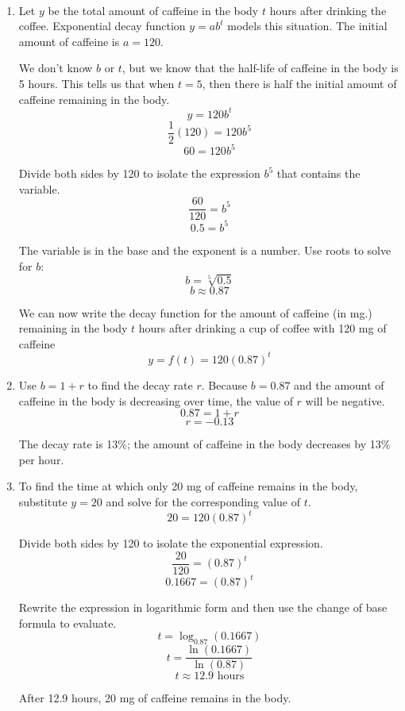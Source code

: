 \begin{solution} ~
    \begin{enumerate}
        \item Let $y$ be the total amount of caffeine in the body $t$ hours after drinking the coffee. Exponential decay function $y = ab^t$ models this situation. The initial amount of caffeine is $a = 120$.

              We don't know $b$ or $t$, but we know that the half-life of caffeine in the body is 5 hours. This tells us that when $t = 5$, then there is half the initial amount of caffeine remaining in the body.
              \[ y = 120b^t \]
              \[ \frac{1}{2}(120) = 120b^5 \]
              \[ 60 = 120b^5 \]

              Divide both sides by 120 to isolate the expression $b^5$ that contains the variable.
              \[ \frac{60}{120} = b^5 \]
              \[ 0.5 = b^5 \]

              The variable is in the base and the exponent is a number. Use roots to solve for $b$:
              \[ b = \sqrt[5]{0.5} \]
              \[ b \approx 0.87 \]

              We can now write the decay function for the amount of caffeine (in mg.) remaining in the body $t$ hours after drinking a cup of coffee with 120 mg of caffeine
              \[ y = f(t) = 120(0.87)^t \]

        \item Use $b = 1 + r$ to find the decay rate $r$. Because $b = 0.87$ and the amount of caffeine in the body is decreasing over time, the value of $r$ will be negative.
              \[ 0.87 = 1 + r \]
              \[ r = -0.13 \]

              The decay rate is 13\%; the amount of caffeine in the body decreases by 13\% per hour.

        \item To find the time at which only 20 mg of caffeine remains in the body, substitute $y = 20$ and solve for the corresponding value of $t$.
              \[ 20 = 120(0.87)^t \]

              Divide both sides by 120 to isolate the exponential expression.
              \[ \frac{20}{120} = (0.87)^t \]
              \[ 0.1667 = (0.87)^t \]

              Rewrite the expression in logarithmic form and then use the change of base formula to evaluate.
              \[ t = \log_{0.87}(0.1667) \]
              \[ t = \frac{\ln(0.1667)}{\ln(0.87)} \]
              \[ t \approx 12.9 \text{ hours} \]

              After 12.9 hours, 20 mg of caffeine remains in the body.
    \end{enumerate}
\end{solution}

